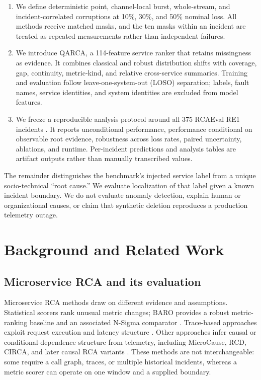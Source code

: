 \documentclass[runningheads]{llncs}
\begin{document}
\begin{enumerate}
\item We define deterministic point, channel-local burst, whole-stream, and
incident-correlated corruptions at 10\%, 30\%, and 50\% nominal loss. All
methods receive matched masks, and the ten masks within an incident are treated
as repeated measurements rather than independent failures.
\item We introduce QARCA, a 114-feature service ranker that retains missingness
as evidence. It combines classical and robust distribution shifts with
coverage, gap, continuity, metric-kind, and relative cross-service summaries.
Training and evaluation follow leave-one-system-out (LOSO) separation; labels,
fault names, service identities, and system identities are excluded from model
features.
\item We freeze a reproducible analysis protocol around all 375 RCAEval RE1
incidents \cite{rcaeval2025}. It reports unconditional performance, performance
conditional on observable root evidence, robustness across loss rates, paired
uncertainty, ablations, and runtime. Per-incident predictions and analysis
tables are artifact outputs rather than manually transcribed values.
\end{enumerate}

The remainder distinguishes the benchmark's injected service label from a
unique socio-technical ``root cause.'' We evaluate localization of that label
given a known incident boundary. We do not evaluate anomaly detection, explain
human or organizational causes, or claim that synthetic deletion reproduces a
production telemetry outage.

\section{Background and Related Work}

\subsection{Microservice RCA and its evaluation}

Microservice RCA methods draw on different evidence and assumptions. Statistical
scorers rank unusual metric changes; BARO provides a robust metric-ranking
baseline and an associated N-Sigma comparator \cite{baro2024}. Trace-based
approaches exploit request execution and latency structure
\cite{microrank2021,tracerca2021,epsilonDiagnosis2019}. Other approaches infer
causal or conditional-dependence structure from telemetry, including
MicroCause, RCD, CIRCA, and later causal RCA variants
\cite{microcause2020,ikram2022rcd,circa2022,causalrca2023,pham2024causal}.
These methods are not interchangeable: some require a call graph, traces, or
multiple historical incidents, whereas a metric scorer can operate on one
window and a supplied boundary.
\end{document}
